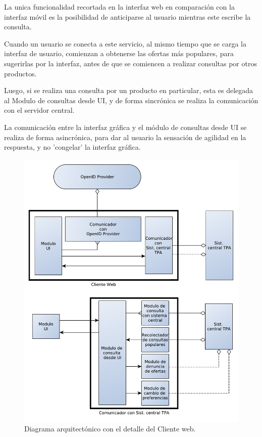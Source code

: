 La unica funcionalidad recortada en la interfaz web en comparación con la interfaz móvil es la posibilidad de anticiparse al usuario mientras este escribe la consulta.

Cuando un usuario se conecta a este servicio, al mismo tiempo que se carga la interfaz de usuario, comienzan a obtenerse las ofertas más populares, para sugerirlas por la interfaz, antes de que se comiencen a realizar consultas por otros productos.

Luego, si se realiza una consulta por un producto en particular, esta es delegada al \textsf{Modulo de consultas desde UI}, y de forma sincrónica se realiza la comunicación con el servidor central.

La comunicación entre la interfaz gráfica y el módulo de consultas desde UI se realiza de forma asincrónica, para dar al usuario la sensación de agilidad en la respuesta, y no 'congelar' la interfaz gráfica.

\begin{figure}[H]
	\centering
	\includegraphics[width=\textwidth]{graficos/arch/Cliente_web.pdf}
	\caption{Diagrama arquitectónico con el detalle del \textsf{Cliente web}.}
\end{figure}



